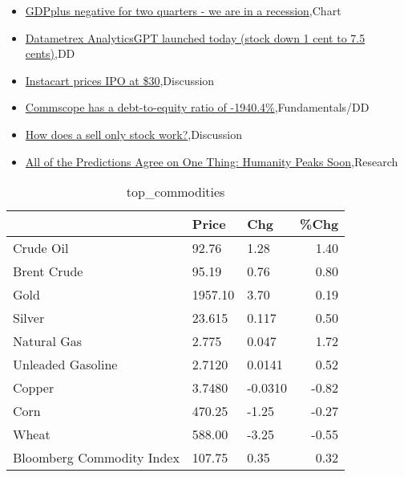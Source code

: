 \documentclass{article}%
\begin{document}
%
\begin{itemize}%
\item%
\href{https://reddit.com/r/wallstreetbets/comments/16mnfxx/gdpplus\_negative\_for\_two\_quarters\_we\_are\_in\_a/}{GDPplus negative for two quarters - we are in a recession},Chart%
\item%
\href{https://reddit.com/r/Baystreetbets/comments/16mb5ah/datametrex\_analyticsgpt\_launched\_today\_stock\_down/}{Datametrex AnalyticsGPT launched today (stock down 1 cent to 7.5 cents)},DD%
\item%
\href{https://reddit.com/r/StockMarket/comments/16mailv/instacart\_prices\_ipo\_at\_30/}{Instacart prices IPO at \$30},Discussion%
\item%
\href{https://reddit.com/r/StockMarket/comments/16lxwkl/commscope\_has\_a\_debttoequity\_ratio\_of\_19404/}{Commscope has a debt-to-equity ratio of -1940.4\%},Fundamentals/DD%
\item%
\href{https://reddit.com/r/StockMarket/comments/16lwzaf/how\_does\_a\_sell\_only\_stock\_work/}{How does a sell only stock work?},Discussion%
\item%
\href{https://reddit.com/r/Economics/comments/16mabci/all\_of\_the\_predictions\_agree\_on\_one\_thing/}{All of the Predictions Agree on One Thing: Humanity Peaks Soon},Research%
\end{itemize}%


\begin{table}[htbp]%
\caption{top\_commodities}%
\centering%
\begin{adjustbox}{width=1\textwidth}%
\begin{tabular}{lllr}
\toprule
                          &   Price &     Chg &  \%Chg \\
\midrule
               Crude Oil  &   92.76 &    1.28 &  1.40 \\
             Brent Crude  &   95.19 &    0.76 &  0.80 \\
                    Gold  & 1957.10 &    3.70 &  0.19 \\
                  Silver  &  23.615 &   0.117 &  0.50 \\
             Natural Gas  &   2.775 &   0.047 &  1.72 \\
       Unleaded Gasoline  &  2.7120 &  0.0141 &  0.52 \\
                  Copper  &  3.7480 & -0.0310 & -0.82 \\
                    Corn  &  470.25 &   -1.25 & -0.27 \\
                   Wheat  &  588.00 &   -3.25 & -0.55 \\
Bloomberg Commodity Index &  107.75 &    0.35 &  0.32 \\
\bottomrule
\end{tabular}
%
\end{adjustbox}%
\end{table}
\end{document}
